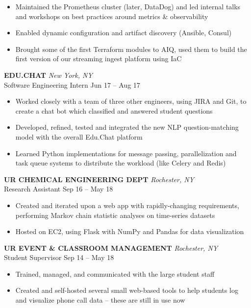 \documentclass[letterpaper]{article}
\begin{document}
\begin{bgbox}[height=\paperheight, colback=white, width=0.62\textwidth]
\begin{itemize} [noitemsep,topsep=4pt]
			\item Maintained the Prometheus cluster (later, DataDog) and led internal talks and workshops on best practices around metrics \& observability
			\item Enabled dynamic configuration and artifact discovery (Ansible, Consul)
			\item Brought some of the first Terraform modules to AIQ, used them to build \linebreak the first version of our streaming ingest platform using IaC
		\end{itemize}
		\vspace*{12pt}
		\textbf{EDU.CHAT} \hfill \textit{New York, NY}\\
		Software Engineering Intern \hfill Jun 17 -- Aug 17
		\begin{itemize} [noitemsep,topsep=4pt]
			\item Worked closely with a team of three other engineers, using JIRA and Git, to create a chat bot which classified and answered student questions
			\item Developed, refined, tested and integrated the new NLP question-matching model with the overall Edu.Chat platform
			\item Learned Python implementations for message passing, parallelization and task queue systems to distribute the workload (like Celery and Redis)
		\end{itemize}
		\vspace*{12pt}
		\textbf{UR CHEMICAL ENGINEERING DEPT} \hfill \textit{Rochester, NY}\\
		Research Assistant \hfill Sep 16 -- May 18
		\begin{itemize} [noitemsep,topsep=4pt]
			\item Created and iterated upon a web app with rapidly-changing requirements, performing Markov chain statistic analyses on time-series datasets
			\item Hosted on EC2, using Flask with NumPy and Pandas for data visualization
		\end{itemize}
		\vspace*{12pt}
		\textbf{UR EVENT \& CLASSROOM MANAGEMENT} \hfill \textit{Rochester, NY}\\
		Student Supervisor \hfill Sep 14 -- May 18
		\begin{itemize} [noitemsep,topsep=4pt]
			\item Trained, managed, and communicated with the large student staff
			\item Created and self-hosted several small web-based tools to help students log and visualize phone call data -- these are still in use now
		\end{itemize}

	\end{bgbox}%
\end{document}

